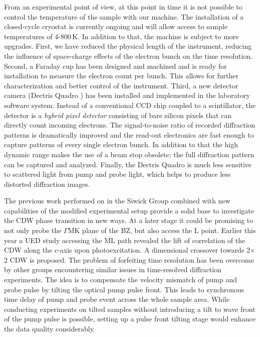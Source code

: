 From an experimental point of view, at this point in time it is not possible to control the temperature of the sample with our machine.
The installation of a closed-cycle cryostat is currently ongoing and will allow access to sample temperatures of 4-800\,K.
In addition to that, the machine is subject to more upgrades.
First, we have reduced the physical length of the instrument, reducing the influence of space-charge effects of the electron bunch on the time resolution.
Second, a Faraday cup has been designed and machined and is ready for installation to measure the electron count per bunch.
This allows for further characterization and better control of the instrument.
Third, a new detector camera (Dectris Quadro \cite{dectris2022}) has been installed and implemented in the laboratory software system.
Instead of a conventional CCD chip coupled to a scintillator, the detector is a \emph{hybrid pixel detector} consisting of bare silicon pixels that can directly count incoming electrons.
The signal-to-noise ratio of recorded diffraction patterns is dramatically improved and the read-out electronics are fast enough to capture patterns of every single electron bunch.
In addition to that the high dynamic range makes the use of a beam stop obsolete; the full diffraction pattern can be captured and analyzed.
Finally, the Dectris Quadro is much less sensitive to scattered light from pump and probe light, which helps to produce less distorted diffraction images.

The previous work performed on \ts\space in the Siwick Group combined with new capabilities of the modified experimental setup provide a solid base to investigate the \ac{CDW} phase transition in new ways.
At a later stage it could be promising to not only probe the $\Gamma\mathrm{MK}$ plane of the \ac{BZ}, but also access the L point.
Earlier this year a \ac{UED} study accessing the $\overline{\mathrm{ML}}$ path revealed the lift of correlation of the \ac{CDW} along the c-axis upon photoexcitation.
A dimensional crossover towards 2$\times$2 \ac{CDW} is proposed\cite{cheng2022}.
The problem of forfeiting time resolution has been overcome by other groups encountering similar issues in time-resolved diffraction experiments.
The idea is to compensate the velocity mismatch of pump and probe pulse by tilting the optical pump pulse front.
This leads to synchronous time delay of pump and probe event across the whole sample area\cite{baum2006,zhou2013}.
While conducting experiments on tilted samples without introducing a tilt to wave front of the pump pulse is possible, setting up a pulse front tilting stage would enhance the data quality considerably.

